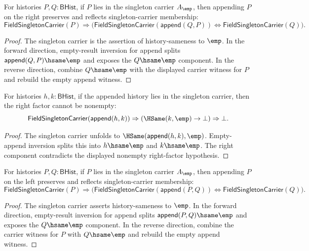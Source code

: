\begin{theorem}
\label{thm:field-singleton-carrier-append-right-cancel}
For histories $P,Q:\mathsf{BHist}$, if $P$ lies in the singleton carrier
$A_{\emp}$, then appending $P$ on the right preserves and reflects
singleton-carrier membership:
$$
\mathsf{FieldSingletonCarrier}(P)\Rightarrow
\bigl(
\mathsf{FieldSingletonCarrier}(\mathsf{append}(Q,P))
\Longleftrightarrow
\mathsf{FieldSingletonCarrier}(Q)
\bigr).
$$
\end{theorem}
\begin{proof}
The singleton carrier is the assertion of history-sameness to $\emp$. In the
forward direction, empty-result inversion for append splits
$\mathsf{append}(Q,P)\hsame\emp$ and exposes the $Q\hsame\emp$ component. In
the reverse direction, combine $Q\hsame\emp$ with the displayed carrier
witness for $P$ and rebuild the empty append witness.
\end{proof}

\begin{theorem}
\label{thm:field-singleton-carrier-append-right-nonempty-absurd}
For histories $h,k:\mathsf{BHist}$, if the appended history lies in the
singleton carrier, then the right factor cannot be nonempty:
$$
\mathsf{FieldSingletonCarrier}(\mathsf{append}(h,k))\Rightarrow
(\HSame(k,\emp)\to\bot)\Rightarrow\bot.
$$
\end{theorem}
\begin{proof}
The singleton carrier unfolds to $\HSame(\mathsf{append}(h,k),\emp)$.
Empty-append inversion splits this into $h\hsame\emp$ and $k\hsame\emp$.
The right component contradicts the displayed nonempty right-factor
hypothesis.
\end{proof}

\begin{theorem}
\label{thm:field-singleton-carrier-append-left-cancel}
For histories $P,Q:\mathsf{BHist}$, if $P$ lies in the singleton carrier
$A_{\emp}$, then appending $P$ on the left preserves and reflects
singleton-carrier membership:
$$
\mathsf{FieldSingletonCarrier}(P)\Rightarrow
\bigl(
\mathsf{FieldSingletonCarrier}(\mathsf{append}(P,Q))
\Longleftrightarrow
\mathsf{FieldSingletonCarrier}(Q)
\bigr).
$$
\end{theorem}
\begin{proof}
The singleton carrier asserts history-sameness to $\emp$. In the forward
direction, empty-result inversion for append splits
$\mathsf{append}(P,Q)\hsame\emp$ and exposes the $Q\hsame\emp$ component. In
the reverse direction, combine the carrier witness for $P$ with
$Q\hsame\emp$ and rebuild the empty append witness.
\end{proof}

